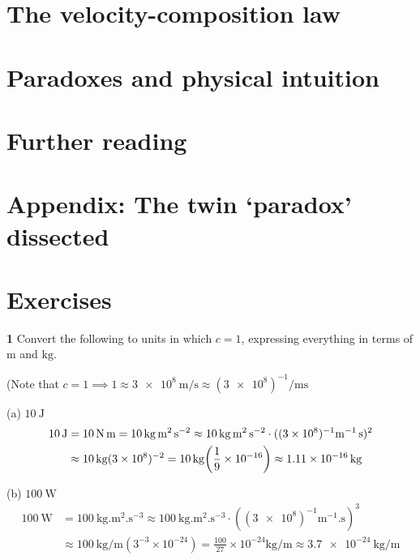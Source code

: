\documentclass[gr-notes.tex]{subfiles}
\begin{document}
\section{The velocity-composition law}

\section{Paradoxes and physical intuition}

\section{Further reading}

\section{Appendix: The twin `paradox' dissected}

\section{Exercises}
\label{sec:ch1-exercises}

\textbf{1}
Convert the following to units in which $c = 1$, expressing everything in terms of $\si{\meter}$ and $\si{\kilogram}$.

(Note that
$c = 1 \implies
 1 \approx \SI{3e8}{\meter\per\second}
   \approx (\num{3e8})^{-1}\si{\per\meter\second}$

(a) $\SI{10}{\joule}$
\begin{align*}
  \SI{10}{\joule} &=
  \SI{10}{\newton.\meter} =
  \SI{10}{\kilogram.\meter^2.\second^{-2}} \approx
  \SI{10}{\kilogram.\meter^2.\second^{-2}} \cdot
  ((\num{3e8})^{-1}\si{\meter^{-1}.\second})^2
  \\ &\approx
  \SI{10}{\kilogram} (\num{3e8})^{-2} =
  \SI{10}{\kilogram} \qty(\frac{1}{9} \times 10^{-16}) \approx
  \SI{1.11e-16}{\kilogram}
\end{align*}

(b) $\SI{100}{\watt}$
\begin{align*}
  \SI{100}{\watt} &=
  \SI{100}{\kilogram.\meter^2.\second^{-3}} \approx
  \SI{100}{\kilogram.\meter^2.\second^{-3}} \cdot
  ((\num{3e8})^{-1} \si{\meter^{-1}.\second})^3
  \\ &\approx
  \SI{100}{\kilogram\per\meter} (3^{-3} \times 10^{-24}) =
  \frac{100}{27} \times 10^{-24} \si{\kilogram\per\meter} \approx
  \SI{3.7e-24}{\kilogram\per\meter}
\end{align*}
\end{document}
